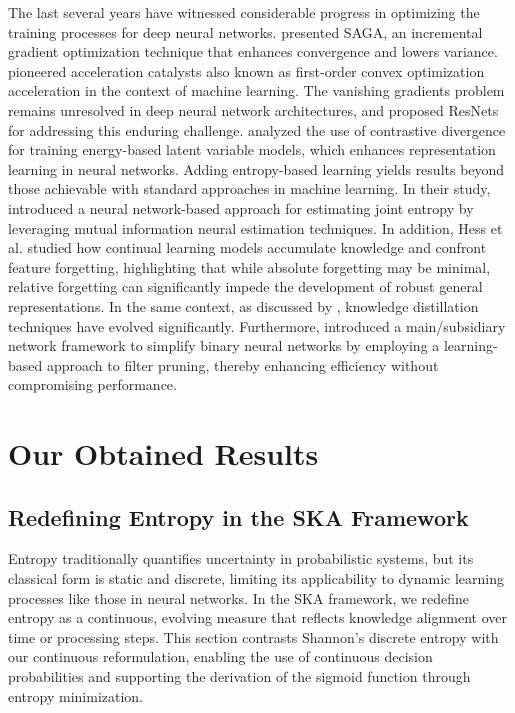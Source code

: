 \documentclass{article}
\begin{document}
\indent The last several years have witnessed considerable progress in optimizing the training processes for deep neural networks. \cite{Defazio2014} presented SAGA, an incremental gradient optimization technique that enhances convergence and lowers variance. \cite{Lin2015} pioneered acceleration catalysts also known as first-order convex optimization acceleration in the context of machine learning. The vanishing gradients problem remains unresolved in deep neural network architectures, and \cite{He2016} proposed ResNets for addressing this enduring challenge. \cite{Qiu2019} analyzed the use of contrastive divergence for training energy-based latent variable models, which enhances representation learning in neural networks. Adding entropy-based learning yields results beyond those achievable with standard approaches in machine learning. In their study, \cite{shalev2022neural} introduced a neural network-based approach for estimating joint entropy by leveraging mutual information neural estimation techniques. In addition, Hess et al. \cite{hess2023knowledge} studied how continual learning models accumulate knowledge and confront feature forgetting, highlighting that while absolute forgetting may be minimal, relative forgetting can significantly impede the development of robust general representations. In the same context, as discussed by \cite{das2024symbolic}, knowledge distillation techniques have evolved significantly. Furthermore, \cite{xu2019main} introduced a main/subsidiary network framework to simplify binary neural networks by employing a learning-based approach to filter pruning, thereby enhancing efficiency without compromising performance. 





\section{Our Obtained Results}

\subsection{Redefining Entropy in the SKA Framework}

Entropy traditionally quantifies uncertainty in probabilistic systems, but its classical form is static and discrete, limiting its applicability to dynamic learning processes like those in neural networks. In the SKA framework, we redefine entropy as a continuous, evolving measure that reflects knowledge alignment over time or processing steps. This section contrasts Shannon’s discrete entropy with our continuous reformulation, enabling the use of continuous decision probabilities and supporting the derivation of the sigmoid function through entropy minimization.
\end{document}
